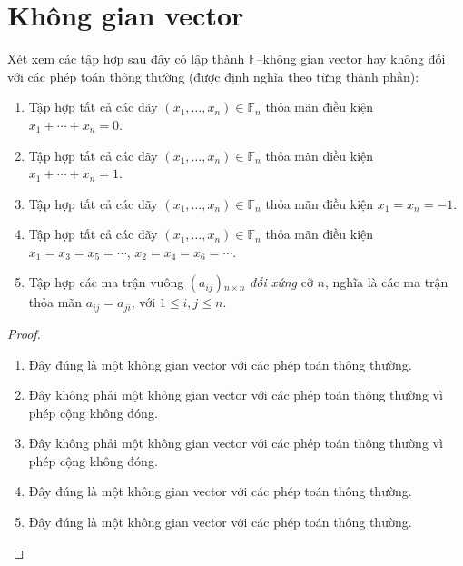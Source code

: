 \setcounter{exercise}{0}


\chapter{Không gian vector}

\begin{exercise}
    Xét xem các tập hợp sau đây có lập thành $\mathbb{F}$--không gian vector hay không đối với các phép toán thông thường (được định nghĩa theo từng thành phần):
    \begin{enumerate}[itemsep=0pt,topsep=0pt,label = (\alph*)]
        \item Tập hợp tất cả các dãy $(x_{1},\ldots,x_{n})\in\mathbb{F}_{n}$ thỏa mãn điều kiện $x_{1} + \cdots + x_{n} = 0$.
        \item Tập hợp tất cả các dãy $(x_{1},\ldots,x_{n})\in\mathbb{F}_{n}$ thỏa mãn điều kiện $x_{1} + \cdots + x_{n} = 1$.
        \item Tập hợp tất cả các dãy $(x_{1},\ldots,x_{n})\in\mathbb{F}_{n}$ thỏa mãn điều kiện $x_{1} = x_{n} = -1$.
        \item Tập hợp tất cả các dãy $(x_{1},\ldots,x_{n})\in\mathbb{F}_{n}$ thỏa mãn điều kiện $x_{1} = x_{3} = x_{5} = \cdots$, $x_{2} = x_{4} = x_{6} = \cdots$.
        \item Tập hợp các ma trận vuông $(a_{ij}){}_{n\times n}$ \textit{đối xứng} cỡ $n$, nghĩa là các ma trận thỏa mãn $a_{ij} = a_{ji}$, với $1\le i, j\le n$.
    \end{enumerate}
\end{exercise}

\begin{proof}
    \begin{enumerate}[label = (\alph*)]
        \item Đây đúng là một không gian vector với các phép toán thông thường.
        \item Đây không phải một không gian vector với các phép toán thông thường vì phép cộng không đóng.
        \item Đây không phải một không gian vector với các phép toán thông thường vì phép cộng không đóng.
        \item Đây đúng là một không gian vector với các phép toán thông thường.
        \item Đây đúng là một không gian vector với các phép toán thông thường.
    \end{enumerate}
\end{proof}

